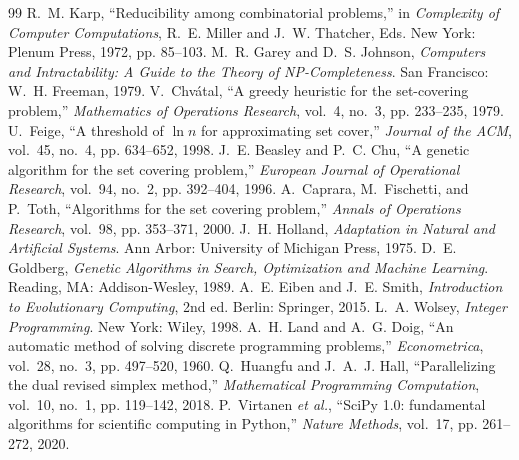 \documentclass[12pt,a4paper]{article}
\begin{document}
\renewcommand{\refname}{Referencias}
\begin{thebibliography}{99}
 R.~M. Karp, ``Reducibility among combinatorial problems,'' in \textit{Complexity of Computer Computations}, R.~E. Miller and J.~W. Thatcher, Eds. New York: Plenum Press, 1972, pp. 85--103.
 M.~R. Garey and D.~S. Johnson, \textit{Computers and Intractability: A Guide to the Theory of NP-Completeness}. San Francisco: W.~H. Freeman, 1979.
 V.~Chv\'atal, ``A greedy heuristic for the set-covering problem,'' \textit{Mathematics of Operations Research}, vol.~4, no.~3, pp. 233--235, 1979.
 U.~Feige, ``A threshold of $\ln n$ for approximating set cover,'' \textit{Journal of the ACM}, vol.~45, no.~4, pp. 634--652, 1998.
 J.~E. Beasley and P.~C. Chu, ``A genetic algorithm for the set covering problem,'' \textit{European Journal of Operational Research}, vol.~94, no.~2, pp. 392--404, 1996.
 A.~Caprara, M.~Fischetti, and P.~Toth, ``Algorithms for the set covering problem,'' \textit{Annals of Operations Research}, vol.~98, pp. 353--371, 2000.
 J.~H. Holland, \textit{Adaptation in Natural and Artificial Systems}. Ann Arbor: University of Michigan Press, 1975.
 D.~E. Goldberg, \textit{Genetic Algorithms in Search, Optimization and Machine Learning}. Reading, MA: Addison-Wesley, 1989.
 A.~E. Eiben and J.~E. Smith, \textit{Introduction to Evolutionary Computing}, 2nd ed. Berlin: Springer, 2015.
 L.~A. Wolsey, \textit{Integer Programming}. New York: Wiley, 1998.
 A.~H. Land and A.~G. Doig, ``An automatic method of solving discrete programming problems,'' \textit{Econometrica}, vol.~28, no.~3, pp. 497--520, 1960.
 Q.~Huangfu and J.~A.~J. Hall, ``Parallelizing the dual revised simplex method,'' \textit{Mathematical Programming Computation}, vol.~10, no.~1, pp. 119--142, 2018.
 P.~Virtanen \textit{et al.}, ``SciPy 1.0: fundamental algorithms for scientific computing in Python,'' \textit{Nature Methods}, vol.~17, pp. 261--272, 2020.
\end{thebibliography}


\end{document}
